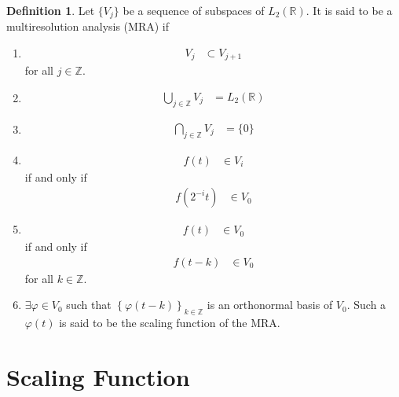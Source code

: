 \documentclass[titlepage, fleqn, a4paper, 12pt, twoside]{article}
\theoremstyle{definition}
\newtheorem{definition}{Definition}
\theoremstyle{theorem}
\begin{document}
\begin{definition}
	Let $\{V_j\}$ be a sequence of subspaces of $L_2(\mathbb{R})$.
	It is said to be a multiresolution analysis (MRA) if
	\begin{enumerate}
		\item
			\begin{align*}
				V_j &\subset V_{j + 1}
			\end{align*}
			for all $j \in \mathbb{Z}$.
		\item
			\begin{align*}
				\bigcup_{j \in \mathbb{Z}} V_j &= L_2(\mathbb{R})
			\end{align*}
		\item
			\begin{align*}
				\bigcap_{j \in \mathbb{Z}} V_j &= \{0\}
			\end{align*}
		\item
			\begin{align*}
				f(t) &\in V_i
			\end{align*}
			if and only if
			\begin{align*}
				f\left( 2^{-i} t \right) &\in V_0
			\end{align*}
		\item
			\begin{align*}
				f(t) &\in V_0
			\end{align*}
			if and only if
			\begin{align*}
				f(t - k) &\in V_0
			\end{align*}
			for all $k \in \mathbb{Z}$.
		\item
			$\exists \varphi \in V_0$ such that $\left\{ \varphi(t - k) \right\}_{k \in \mathbb{Z}}$ is an orthonormal basis of $V_0$.
			Such a $\varphi(t)$ is said to be the scaling function of the MRA.
	\end{enumerate}
\end{definition}

\section{Scaling Function}
\end{document}
